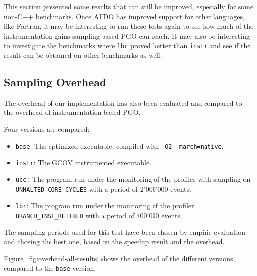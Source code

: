 \documentclass[9pt,english,twocolumn,letter]{article}
\begin{document}
This section presented some results that can still be improved, especially for some non-C++ benchmarks. Once AFDO has improved support for other languages, like Fortran, it may be interesting to run these tests again to see how much of the instrumentation gains sampling-based PGO can reach. It may also be interesting to investigate the benchmarks where \texttt{lbr} proved better than \texttt{instr} and see if the result can be obtained on other benchmarks as well.

\subsection{Sampling Overhead}

The overhead of our implementation has also been evaluated and compared to the overhead of instrumentation-based PGO.

Four versions are compared:
\begin{itemize}
    \item \texttt{base}: The optimized executable, compiled with \texttt{-O2 -march=native}.
    \item \texttt{instr}: The GCOV instrumented executable.
    \item \texttt{ucc:} The program run under the monitoring of the profiler with sampling on \texttt{UNHALTED\_CORE\_CYCLES} with a period of 2'000'000 events.
    \item \texttt{lbr}: The program run under the monitoring of the profiler \texttt{BRANCH\_INST\_RETIRED} with a period of 400'000 events.
\end{itemize}

The sampling periods used for this test have been chosen by empiric evaluation and chosing the best one, based on the speedup result and the overhead.

Figure~\ref{fig:overhead-all-results} shows the overhead of the different versions, compared to the \texttt{base} version.
\end{document}
